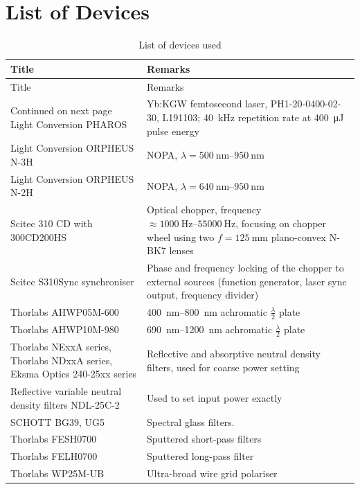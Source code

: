 \documentclass[twoside,openright,listof=numbered]{scrreprt}
\begin{document}
\chapter{List of Devices}
\let\cleardoublepage\clearpage
\begin{longtable}{p{}p{}}
    \caption{List of devices used}
    \label{tab:devices} \\
    \toprule 
    Title & Remarks \\
    \midrule
    \endfirsthead
    \toprule 
    Title & Remarks \\
    \midrule
    \endhead
    \midrule
    Continued on next page
    \endfoot
    \bottomrule
    \endlastfoot
    Light Conversion PHAROS & Yb:KGW femtosecond laser, PH1-20-0400-02-30, L191103; \SI{40}{\kilo\hertz} repetition rate at \SI{400}{\micro\joule} pulse energy \\
    Light Conversion ORPHEUS N-3H & NOPA, $ \lambda = \SIrange{500}{950}{\nano\meter} $ \\
    Light Conversion ORPHEUS N-2H & NOPA, $ \lambda = \SIrange{640}{950}{\nano\meter} $ \\
    Scitec 310 CD with 300CD200HS & Optical chopper, frequency $\approx \SIrange{1000}{55000}{\hertz}$, focusing on chopper wheel using two $f=\SI{125}{\milli\meter}$ plano-convex N-BK7 lenses \\
    Scitec S310Sync synchroniser & Phase and frequency locking of the chopper to external sources (function generator, laser sync output, frequency divider) \\
    Thorlabs AHWP05M-600 & \SIrange{400}{800}{\nano\meter} achromatic $\frac{\lambda}{2}$ plate \\
    Thorlabs AHWP10M-980 & \SIrange{690}{1200}{\nano\meter} achromatic $\frac{\lambda}{2}$ plate \\
    Thorlabs NExxA series, Thorlabs NDxxA series, Eksma Optics 240-25xx series & Reflective and absorptive neutral density filters, used for coarse power setting \\
    Reflective variable neutral density filters
NDL-25C-2 & Used to set input power exactly \\
    SCHOTT BG39, UG5  & Spectral glass filters.\\
    Thorlabs FESH0700 & Sputtered short-pass filters \\
    Thorlabs FELH0700 & Sputtered long-pass filter \\
    Thorlabs WP25M-UB & Ultra-broad wire grid polariser \\

\end{longtable}
\end{document}
